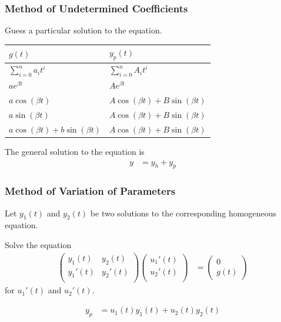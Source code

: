 \documentclass[fleqn, a4paper, 8pt, twoside]{amsart}
\theoremstyle{definition}
\theoremstyle{theorem}
\begin{document}
\begin{multicols}{2}
\begin{spacing}{0.85}
\subsubsection{Method of Undetermined Coefficients}

\begin{algorithmic}[1]
	\item
		Guess a particular solution to the equation.\\
		\begin{tabular}{l l}
			\toprule
			$g(t)$ & $y_p(t)$\\
			\midrule
			$\sum\limits_{i = 0}^{n} a_i t^i$ & $\sum\limits_{i = 0}^{n} A_i t^i$\\
			$a e^{\beta t}$ & $A e^{\beta t}$\\
			$a \cos(\beta t)$ & $A \cos(\beta t) + B \sin(\beta t)$\\
			$a \sin(\beta t)$ & $A \cos(\beta t) + B \sin(\beta t)$\\
			$a \cos(\beta t) + b \sin(\beta t)$ & $A \cos(\beta t) + B \sin(\beta t)$\\
			\bottomrule
		\end{tabular}
	\item
		The general solution to the equation is
		\begin{align*}
			y &= y_h + y_p
		\end{align*}
\end{algorithmic}

\subsubsection{Method of Variation of Parameters}

\begin{algorithmic}[1]
	\item
		Let $y_1(t)$ and $y_2(t)$ be two solutions to the corresponding homogeneous equation.
	\item
		Solve the equation
		\begin{align*}
				\begin{pmatrix}
					y_1(t) & y_2(t)\\
					{y_1}'(t) & {y_2}'(t)\\
				\end{pmatrix}
				\begin{pmatrix}
					{u_1}'(t)\\
					{u_2}'(t)\\
				\end{pmatrix}
			&=
				\begin{pmatrix}
					0\\
					g(t)
				\end{pmatrix}
		\end{align*}
		for ${u_1}'(t)$ and ${u_2}'(t)$.
	\item
		\begin{align*}
			y_p &= u_1(t) y_1(t) + u_2(t) y_2(t)
		\end{align*}
\end{algorithmic}


\end{spacing}
\end{multicols}
\end{document}

